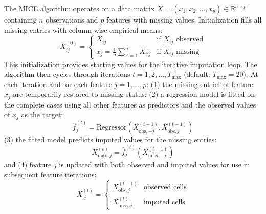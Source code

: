 \documentclass[12pt,a4paper]{article}
\begin{document}
The MICE algorithm operates on a data matrix $X = (x_1, x_2, \ldots, x_p) \in \mathbb{R}^{n \times p}$ containing $n$ observations and $p$ features with missing values. Initialization fills all missing entries with column-wise empirical means:
\begin{equation}
\label{eq:mice_init}
X_{ij}^{(0)} = \begin{cases} X_{ij} & \text{if } X_{ij} \text{ observed} \\ \bar{x}_j = \frac{1}{n} \sum_{i'=1}^{n} X_{i'j} & \text{if } X_{ij} \text{ missing} \end{cases}
\end{equation}
This initialization provides starting values for the iterative imputation loop. The algorithm then cycles through iterations $t = 1, 2, \ldots, T_{\max}$ (default: $T_{\max} = 20$). At each iteration and for each feature $j = 1, \ldots, p$: (1) the missing entries of feature $x_j$ are temporarily restored to missing status; (2) a regression model is fitted on the complete cases using all other features as predictors and the observed values of $x_j$ as the target:
\begin{equation}
\label{eq:mice_regress}
\hat{f}_j^{(t)} = \text{Regressor}(X_{\text{obs}, -j}^{(t-1)}, X_{\text{obs}, j}^{(t-1)})
\end{equation}
(3) the fitted model predicts imputed values for the missing entries:
\begin{equation}
\label{eq:mice_predict}
X_{\text{miss}, j}^{(t)} = \hat{f}_j^{(t)}(X_{\text{miss}, -j}^{(t-1)})
\end{equation}
and (4) feature $j$ is updated with both observed and imputed values for use in subsequent feature iterations:
\begin{equation}
\label{eq:mice_update}
X_{\cdot j}^{(t)} = \begin{cases} X_{\text{obs}, j}^{(t-1)} & \text{observed cells} \\ X_{\text{miss}, j}^{(t)} & \text{imputed cells} \end{cases}
\end{equation}
\end{document}
